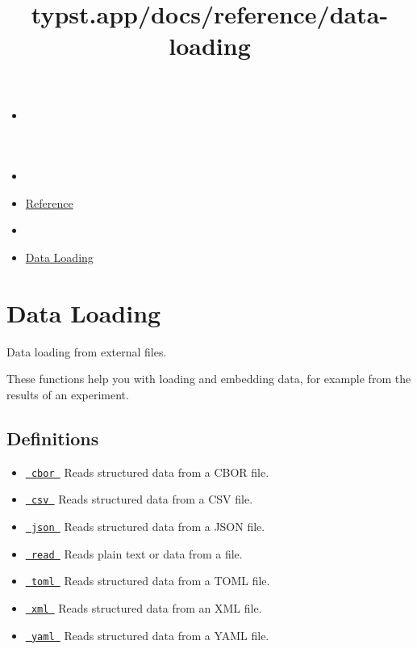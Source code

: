 \title{typst.app/docs/reference/data-loading}

\begin{itemize}
\tightlist
\item
  \href{/docs}{}
\item
  
\item
  \href{/docs/reference/}{Reference}
\item
  
\item
  \href{/docs/reference/data-loading/}{Data Loading}
\end{itemize}

\section{Data Loading}\label{summary}

Data loading from external files.

These functions help you with loading and embedding data, for example
from the results of an experiment.

\subsection{Definitions}\label{definitions}

\begin{itemize}
\tightlist
\item
  \href{/docs/reference/data-loading/cbor/}{\texttt{\ cbor\ }} { Reads
  structured data from a CBOR file. }
\item
  \href{/docs/reference/data-loading/csv/}{\texttt{\ csv\ }} { Reads
  structured data from a CSV file. }
\item
  \href{/docs/reference/data-loading/json/}{\texttt{\ json\ }} { Reads
  structured data from a JSON file. }
\item
  \href{/docs/reference/data-loading/read/}{\texttt{\ read\ }} { Reads
  plain text or data from a file. }
\item
  \href{/docs/reference/data-loading/toml/}{\texttt{\ toml\ }} { Reads
  structured data from a TOML file. }
\item
  \href{/docs/reference/data-loading/xml/}{\texttt{\ xml\ }} { Reads
  structured data from an XML file. }
\item
  \href{/docs/reference/data-loading/yaml/}{\texttt{\ yaml\ }} { Reads
  structured data from a YAML file. }
\end{itemize}

